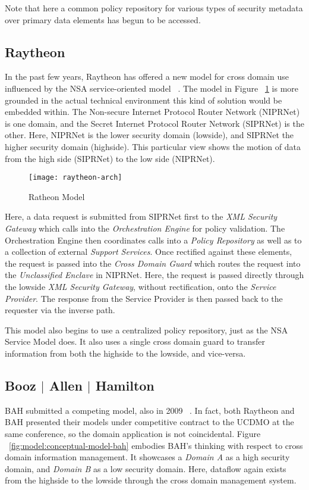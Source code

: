 Note that here a common policy repository for various types of security metadata over primary data elements has begun to be accessed.

\subsection{Raytheon}
In the past few years, Raytheon has offered a new model for cross domain use influenced by the NSA service-oriented model ~\cite{proposal:raytheon-arch}.  The model in Figure ~\ref{fig:model:conceptual-model-ray} is more grounded in the actual technical environment this kind of solution would be embedded within.  The Non-secure Internet Protocol Router Network (NIPRNet) is one domain, and the Secret Internet Protocol Router Network (SIPRNet) is the other.  Here, NIPRNet is the lower security domain (lowside), and SIPRNet the higher security domain (highside).  This particular view shows the motion of data from the high side (SIPRNet) to the low side (NIPRNet).

\begin{figure}[!t]
\centering
\texttt{[image: raytheon-arch]}
\caption{Ratheon Model}
\label{fig:model:conceptual-model-ray}
\end{figure}

Here, a data request is submitted from SIPRNet first to the \textit{XML Security Gateway} which calls into the \textit{Orchestration Engine} for policy validation.  The Orchestration Engine then coordinates calls into a \textit{Policy Repository} as well as to a collection of external \textit{Support Services}.  Once rectified against these elements, the request is passed into the \textit{Cross Domain Guard} which routes the request into the \textit{Unclassified Enclave} in NIPRNet.  Here, the request is passed directly through the lowside \textit{XML Security Gateway}, without rectification, onto the \textit{Service Provider}.  The response from the Service Provider is then passed back to the requester via the inverse path.

This model also begins to use a centralized policy repository, just as the NSA Service Model does.  It also uses a single cross domain guard to transfer information from both the highside to the lowside, and vice-versa.

\subsection{Booz $\mid$ Allen $\mid$ Hamilton}
BAH submitted a competing model, also in 2009 ~\cite{proposal:bah-arch}.  In fact, both Raytheon and BAH presented their models under competitive contract to the UCDMO at the same conference, so the domain application is not coincidental.  Figure ~\ref{fig:model:conceptual-model-bah} embodies BAH's thinking with respect to cross domain information management.  It showcases a \textit{Domain A} as a high security domain, and \textit{Domain B} as a low security domain.  Here, dataflow again exists from the highside to the lowside through the cross domain management system.

